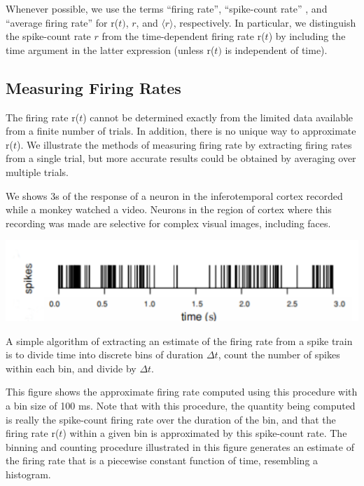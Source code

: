 \begin{rem}
  Whenever possible, we use the terms “firing rate”, “spike-count rate”
, and “average firing rate” for r($t)$, $r$, and $\langle  r\rangle  $, respectively. In particular, 
we distinguish the spike-count rate $r$
from the time-dependent firing rate r($t$) by
including the time argument in the latter expression (unless r($t)$ is independent of time).
\end{rem}

\subsection{Measuring Firing Rates}

\begin{ntn}
  The firing rate r($t$) cannot be determined exactly from the limited data
available from a finite number of trials. In addition, there is no unique
way to approximate r($t$).
  We illustrate the methods of measuring firing rate by extracting
  firing rates from a single trial, but more accurate results could be obtained
  by averaging over multiple trials.
  \begin{exm}
    We shows $3$s of the response of a neuron in the inferotemporal cortex 
  recorded while a monkey watched a video. Neurons
  in the region of cortex where this recording was made are selective for
  complex visual images, including faces.
  \end{exm}
\end{ntn}
\begin{center}
  \label{fig:1.4A}
    \includegraphics[scale=0.048]{./png/fig_1_4A.png}
  \end{center}

\begin{alg}
  A simple algorithm of extracting an estimate of the firing rate from a spike train is to divide time into
discrete bins of duration $\Delta t$, count the number of spikes within each bin,
and divide by $\Delta t$.
\end{alg}

\begin{exm}
  This figure shows the approximate firing rate computed
using this procedure with a bin size of 100 ms. Note that with this procedure, the quantity being computed is 
really the spike-count firing rate over the duration of the bin, and that the firing rate 
r($t$) within a 
given bin is approximated by this spike-count rate. The binning and counting procedure 
illustrated in this figure 
generates an estimate of the firing rate that is a piecewise constant function of time, 
resembling a histogram.
\end{exm}

